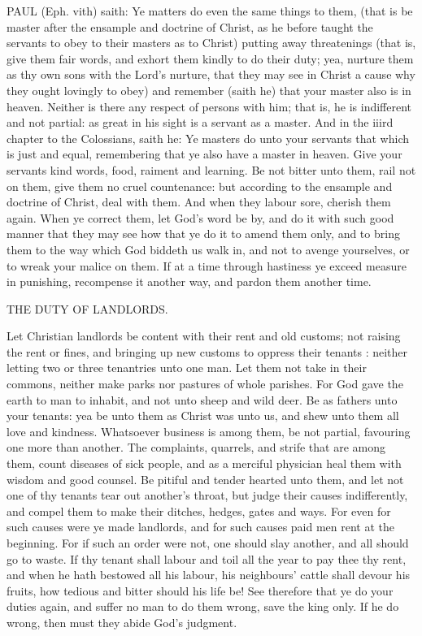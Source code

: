 PAUL (Eph. vith) saith: Ye matters do even the same 
things to them, (that is be master after the ensample 
and doctrine of Christ, as he before taught the servants to 
obey to their masters as to Christ) putting away threatenings
(that is, give them fair words, and exhort them 
kindly to do their duty; yea, nurture them as thy own 
sons with the Lord's nurture, that they may see in Christ 
a cause why they ought lovingly to obey) and remember 
(saith he) that your master also is in heaven. Neither is 
there any respect of persons with him; that is, he is indifferent
and not partial: as great in his sight is a servant 
as a master. And in the iiird chapter to the Colossians, 
saith he: Ye masters do unto your servants that which is 
just and equal, remembering that ye also have a master in 
heaven. Give your servants kind words, food, raiment 
and learning. Be not bitter unto them, rail not on them, 
give them no cruel countenance: but according to the ensample
and doctrine of Christ, deal with them. And 
when they labour sore, cherish them again. When ye 
correct them, let God's word be by, and do it with such 
good manner that they may see how that ye do it to amend 
them only, and to bring them to the way which God 
biddeth us walk in, and not to avenge yourselves, or to 
wreak your malice on them. If at a time through hastiness 
ye exceed measure in punishing, recompense it another 
way, and pardon them another time. 


THE DUTY OF LANDLORDS. 

Let Christian landlords be content with their rent and 
old customs; not raising the rent or fines, and bringing 
up new customs to oppress their tenants : neither letting 
two or three tenantries unto one man. Let them not take 
in their commons, neither make parks nor pastures of 
whole parishes. For God gave the earth to man to inhabit, 
and not unto sheep and wild deer. Be as fathers unto 
your tenants: yea be unto them as Christ was unto us, 
and shew unto them all love and kindness. Whatsoever 
business is among them, be not partial, favouring one more 
than another. The complaints, quarrels, and strife that 
are among them, count diseases of sick people, and as a 
merciful physician heal them with wisdom and good counsel.
Be pitiful and tender hearted unto them, and let not 
one of thy tenants tear out another's throat, but judge 
their causes indifferently, and compel them to make their 
ditches, hedges, gates and ways. For even for such causes 
were ye made landlords, and for such causes paid men rent 
at the beginning. For if such an order were not, one 
should slay another, and all should go to waste. If thy 
tenant shall labour and toil all the year to pay thee thy rent, 
and when he hath bestowed all his labour, his neighbours' 
cattle shall devour his fruits, how tedious and bitter should 
his life be! See therefore that ye do your duties again, and 
suffer no man to do them wrong, save the king only. If 
he do wrong, then must they abide God's judgment. 


